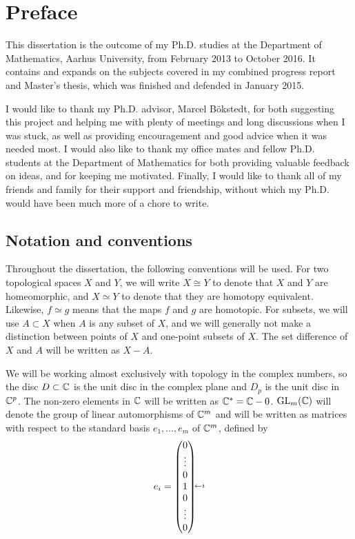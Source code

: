 \chapter{Preface}

This dissertation is the outcome of my Ph.D. studies at the Department
of Mathematics, Aarhus University, from February 2013 to October
2016. It contains and expands on the subjects covered in my combined
progress report and Master's thesis, which was finished and defended
in January 2015.

I would like to thank my Ph.D. advisor, Marcel B\"okstedt, for both
suggesting this project and helping me with plenty of meetings and long
discussions when I was stuck, as well as providing
encouragement and good advice when it was needed most.
I would also like to thank my office mates and fellow Ph.D. students
at the Department of Mathematics
for both providing valuable feedback on ideas, and for keeping me
motivated.
Finally, I would like to thank all of my friends and family for their
support and friendship, without which my Ph.D. would have been much
more of a chore to write.

\section{Notation and conventions}

Throughout the dissertation, the following conventions will be used.
For two topological spaces $X$ and $Y$, we will write $X \cong Y$ to
denote that $X$ and $Y$ are homeomorphic, and $X\simeq Y$ to denote
that they are homotopy equivalent. Likewise, $f \simeq g$ means that
the maps $f$ and $g$ are homotopic. For subsets, we will use $A
\subset X$ when $A$ is any subset of $X$, and we will generally not
make a distinction between points of $X$ and one-point subsets of
$X$. The set difference of $X$ and $A$ will be written as $X-A$.

We will be working almost exclusively with topology in the complex
numbers,
so the disc $D\subset\mathbb{C}$ is the unit disc in the complex plane and
$D_p$ is the unit disc in $\mathbb{C}^p$. The non-zero elements in $\mathbb{C}$ will
be written as $\mathbb{C}^* = \mathbb{C} - 0$. $\operatorname{GL}_m(\mathbb{C})$ will denote the group of
linear automorphisms of $\mathbb{C}^m$ and will be written as matrices with
respect to the standard basis $e_1,\dots,e_m$ of $\mathbb{C}^m$,
defined by
\[ \xy (9,0.5)*{\scriptstyle\leftarrow i};
(0,0)*{e_i =
\begin{pmatrix}
  0 \\
  \vdots \\
  0 \\
  1 \\
  0 \\
  \vdots \\
  0
\end{pmatrix}}; \endxy
\]

